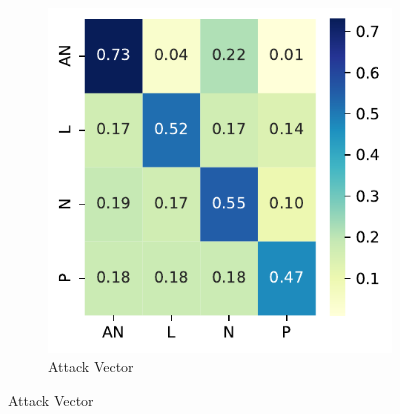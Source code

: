 \documentclass[12pt]{article}
\begin{document}
\begin{figure}[H]
	\centering
	\begin{subfigure}[t]{0.45\textwidth}
		\includegraphics[width=\textwidth]{./figures/confusion_matrices/attack_vector_mitre.pdf}
		\caption{Attack Vector}


\end{subfigure}
\end{figure}
\end{document}
